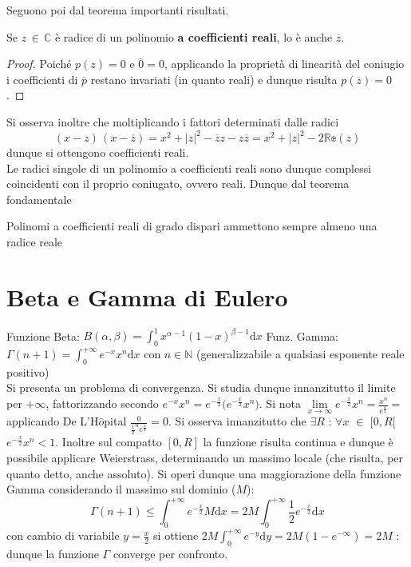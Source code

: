 \documentclass[10pt, oneside]{book}
\theoremstyle{plain}
\begin{document}
Seguono poi dal teorema importanti risultati.

\begin{cor}
Se $z \, \in \, \mathbb{C}$ è radice di un polinomio \textbf{a coefficienti reali}, lo è anche $\overline{z}$.
\end{cor}
\begin{proof}
Poiché $p(z) = 0$ e $\overline{0} = 0$, applicando la proprietà di linearità del coniugio i coefficienti di $\overline{p}$ restano invariati (in quanto reali) e dunque risulta $p(\overline{z}) = 0$.
\end{proof}
Si osserva inoltre che moltiplicando i fattori determinati dalle radici
\[(x - z)\, (x - \overline{z}) = x^2 + |z|^2 - \overline{z}z - z \overline{z} = x^2 + |z|^2 - 2 \mathbb{Re}(z)\]
dunque si ottengono coefficienti reali.
\\Le radici singole di un polinomio a coefficienti reali sono dunque complessi coincidenti con il proprio coniugato, ovvero reali. Dunque dal teorema fondamentale
\begin{oss}
Polinomi a coefficienti reali di grado dispari ammettono sempre almeno una radice reale
\end{oss}






\section{Beta e Gamma di Eulero}
Funzione Beta: $\displaystyle B (\alpha, \beta) = \int_0^1 x^{\alpha - 1} (1 - x)^{\beta - 1}\textrm{d}x$  Funz. Gamma: $\displaystyle \Gamma(n+1) = \int_0^{+\infty} e^{-x} x^n\textrm{d}x$ con $n \in \mathbb{N}$ (generalizzabile a qualsiasi esponente reale positivo)
\\Si presenta un problema di convergenza. Si studia dunque innanzitutto il limite per $+\infty$, fattorizzando secondo $\displaystyle e^{-x}x^n = e^{-\frac{x}{2}}\big(e^{-\frac{x}{2}}x^n\big)$. Si nota $\displaystyle \lim \limits_{x \rightarrow \infty} e^{-\frac{x}{2}} x^n = \frac{x^n}{e^{\frac{x}{2}}}=$ applicando De L'H$\hat{o}$pital $\displaystyle \frac{0}{\frac{1}{2}^n e^{\frac{x}{2}}} = 0$.
Si osserva innanzitutto che $\exists R$ : $\forall x $ $\in$ $[0,R[$ $e^{-\frac{x}{2}} x^n < 1$. Inoltre sul compatto $[0,R]$ la funzione risulta continua e dunque è possibile applicare Weierstrass, determinando un massimo locale (che risulta, per quanto detto, anche assoluto).
Si operi dunque una maggiorazione della funzione Gamma considerando il massimo sul dominio ($M$):
\[\Gamma(n+1) \leq \int_0^{+\infty} e^{-\frac{x}{2}} M\textrm{d}x = 2M \int_0^{+\infty} \frac{1}{2} e^{-\frac{x}{2}}\textrm{d}x\]
con cambio di variabile $\displaystyle y = \frac{x}{2}$ si ottiene $\displaystyle 2M \int_0^{+\infty} e^{-y} \textrm{d}y = 2M (1 - e^{-\infty}) = 2M$ : dunque la funzione $\Gamma$ converge per confronto.
\end{document}
